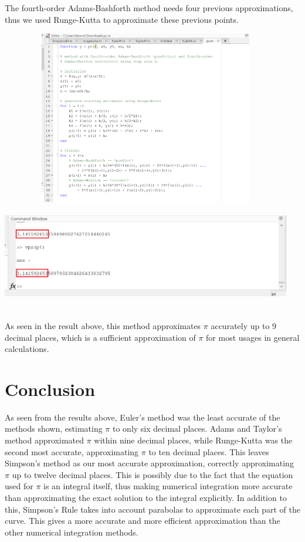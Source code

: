 \documentclass[letterpaper,12pt]{article}
\begin{document}
    The fourth-order Adams-Bashforth method needs four previous approximations, thus we used Runge-Kutta to approximate these previous points. 
\\
\begin{center}
    \includegraphics[width=5in, height=3in]{AdamsCode.png}
\end{center}
\begin{center} 
    \includegraphics[width=5in, height=1.5in]{AdamsResult.png}
\end{center} \cite{Dobrushkin}
\\ 
\indent As seen in the result above, this method approximates $\pi$ accurately up to 9 decimal places, which is a sufficient approximation of $\pi$ for most usages in general calculations. 
\section{Conclusion}

\indent As seen from the results above, Euler's method was the least accurate of the methods shown, estimating $\pi$ to only six decimal places. Adams and Taylor's method approximated $\pi$ within nine decimal places, while Runge-Kutta was the second most accurate, approximating $\pi$ to ten decimal places. This leaves Simpson's method as our most accurate approximation, correctly approximating $\pi$ up to twelve decimal places. This is possibly due to the fact that the equation used for $\pi$ is an integral itself, thus making numerical integration more accurate than approximating the exact solution to the integral explicitly. In addition to this, Simpson's Rule takes into account parabolas to approximate each part of the curve. This gives a more accurate and more efficient approximation than the other numerical integration methods. 
\end{document}
